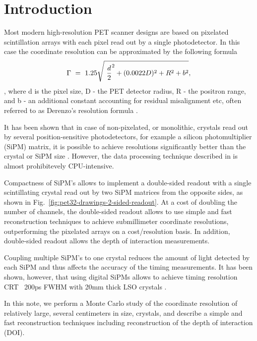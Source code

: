\documentclass[12pt]{article}
\begin{document}
{\tableofcontents}

\newpage
\section{Introduction}

Most modern high-resolution PET scanner designs are based on pixelated scintillation 
arrays with each pixel read out by a single photodetector. In this case the coordinate 
resolution can be approximated by the following formula
$$
     \Gamma ~=~ 1.25 \sqrt{ ~ {d \over 2}^2 + (0.0022D)^2 + R^2 + b^2} ,
$$
, where d is the pixel size, D - the PET detector radius, R - the positron 
range, and b - an additional constant accounting for residual misalignment 
etc, often referred to as Derenzo's resolution formula \cite{derenzo1997}.

It has been shown that in case of non-pixelated, or monolithic, crystals read 
out by several position-sensitive photodetectors, for example a silicon 
photomultiplier (SiPM) matrix, it is possible to achieve resolutions 
significantly better than the crystal or SiPM size \cite{van_dam_2011}. 
However, the data processing technique described in\cite{van_dam_2011} 
is almost prohibitevely CPU-intensive.

Compactness of SiPM's allows to implement a double-sided readout with a single 
scintillating crystal read out by two SiPM matrices from the opposite sides, 
as shown in Fig.~\ref{fig:pet32-drawings-2-sided-readout}. 
%
At a cost of doubling the number of channels, the double-sided readout allows 
to use simple and fast reconstruction techniques to achieve submillimeter 
coordinate resolutions, outperforming the pixelated arrays on a cost/resolution 
basis.
%
In addition, double-sided readout allows the depth of interaction measurements. 

Coupling multiple SiPM's to one crystal reduces the amount of light detected 
by each SiPM and thus affects the accuracy of the timing measurements. 
It has been shown, however, that using digital SiPMs allows to achieve 
timing resolution CRT \lt\ 200ps FWHM with 20mm thick LSO crystals \cite{schaart_2012}. 

In this note, we perform a Monte Carlo study of the coordinate resolution of 
relatively large, several centimeters in size, crystals, and describe a simple 
and fast reconstruction techniques including reconstruction of the depth 
of interaction (DOI).
\end{document}
